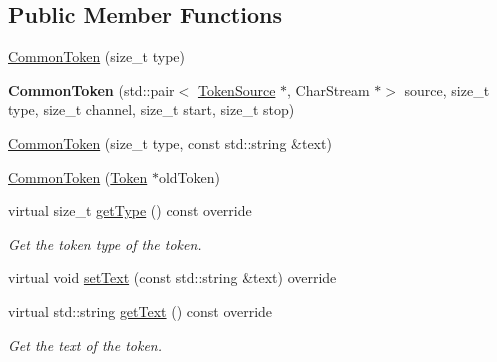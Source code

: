 \subsection*{Public Member Functions}
\begin{DoxyCompactItemize}
\item 
\hyperlink{classantlr4_1_1CommonToken_ae611986affd43e33d45ec933b602e3d6}{Common\+Token} (size\+\_\+t type)
\item 
\mbox{\label{classantlr4_1_1CommonToken_a87885416f03f8aa19a5ea1ad1c6d9924}} 
{\bfseries Common\+Token} (std\+::pair$<$ \hyperlink{classantlr4_1_1TokenSource}{Token\+Source} $\ast$, Char\+Stream $\ast$$>$ source, size\+\_\+t type, size\+\_\+t channel, size\+\_\+t start, size\+\_\+t stop)
\item 
\hyperlink{classantlr4_1_1CommonToken_a7da9b35d9ae9484244b5567e3bce7cb4}{Common\+Token} (size\+\_\+t type, const std\+::string \&text)
\item 
\hyperlink{classantlr4_1_1CommonToken_a7e8aa41e9bf31b4899c18ca9302a65f4}{Common\+Token} (\hyperlink{classantlr4_1_1Token}{Token} $\ast$old\+Token)
\item 
\mbox{\label{classantlr4_1_1CommonToken_ac0b41ca2dab18549439230ecd832be6b}} 
virtual size\+\_\+t \hyperlink{classantlr4_1_1CommonToken_ac0b41ca2dab18549439230ecd832be6b}{get\+Type} () const override
\begin{DoxyCompactList}\small\item\em Get the token type of the token. \end{DoxyCompactList}\item 
virtual void \hyperlink{classantlr4_1_1CommonToken_a2963f31fa12fdb1c5c26711004177554}{set\+Text} (const std\+::string \&text) override
\item 
\mbox{\label{classantlr4_1_1CommonToken_abd1d06568aa3d4aa0180b9ca316ecfcd}} 
virtual std\+::string \hyperlink{classantlr4_1_1CommonToken_abd1d06568aa3d4aa0180b9ca316ecfcd}{get\+Text} () const override
\begin{DoxyCompactList}\small\item\em Get the text of the token. \end{DoxyCompactList}\item 
\mbox{\label{classantlr4_1_1CommonToken_ac6b841c996bb1d611b24fcda2be32888}} 
$$
\end{DoxyCompactItemize}

